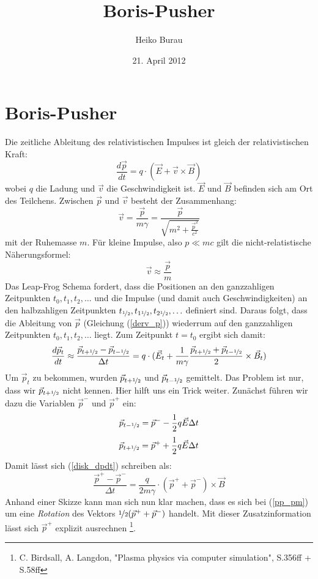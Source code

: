 \documentclass[a4paper,12pt]{article}
\title{Boris-Pusher}
\author{Heiko Burau}
\date{21. April 2012}
\begin{document}
\section{Boris-Pusher}

Die zeitliche Ableitung des relativistischen Impulses ist gleich der relativistischen Kraft:
\begin{equation}
	\label{derv_p}
	\frac{d\vec{p}}{dt} = q \cdot (\vec{E} + \vec{v} \times \vec{B})
\end{equation}
wobei $q$ die Ladung und $\vec{v}$ die Geschwindigkeit ist. $\vec{E}$ und $\vec{B}$ befinden sich am Ort des Teilchens. Zwischen $\vec{p}$ und $\vec{v}$ besteht der Zusammenhang:
\begin{equation}
	\vec{v} = \frac{\vec{p}}{m \gamma} = \frac{\vec{p}}{\sqrt{m^{2} + \frac{\vec{p}^{2}}{c^{2}}}}
\end{equation}
mit der Ruhemasse $m$. Für kleine Impulse, also $p \ll m c$ gilt die nicht-relatistische Näherungsformel:
\begin{equation}
	\vec{v} \approx \frac{\vec{p}}{m}
\end{equation}
Das Leap-Frog Schema fordert, dass die Positionen an den ganzzahligen Zeitpunkten $t_{0}, t_{1}, t_{2}, \ldots$ und die Impulse (und damit auch Geschwindigkeiten) an den halbzahligen Zeitpunkten $t_{\nicefrac{1}{2}}, t_{1\nicefrac{1}{2}}, t_{2\nicefrac{1}{2}}, \ldots$ definiert sind. Daraus folgt, dass die Ableitung von $\vec{p}$ (Gleich\-ung (\ref{derv_p})) wiederrum auf den ganzzahligen Zeitpunkten $t_{0}, t_{1}, t_{2}, \ldots$ liegt. Zum Zeitpunkt $t=t_{0}$ ergibt sich damit:
\begin{equation}
	\label{disk_dpdt}
	\frac{d\vec{p}_{t}}{dt} \approx \frac{\vec{p}_{t + \nicefrac{1}{2}} - \vec{p}_{t - \nicefrac{1}{2}}}{\Delta t}
	= q \cdot (\vec{E}_{t} + \frac{1}{m \gamma} \frac{\vec{p}_{t + \nicefrac{1}{2}} + \vec{p}_{t - \nicefrac{1}{2}}}{2} \times \vec{B}_{t} )
\end{equation}
Um $\vec{p}_{t}$ zu bekommen, wurden $\vec{p}_{t + \nicefrac{1}{2}}$ und $\vec{p}_{t - \nicefrac{1}{2}}$ gemittelt. Das Problem ist nur, dass wir $\vec{p}_{t + \nicefrac{1}{2}}$ nicht kennen. Hier hilft uns ein Trick weiter. Zunächst führen wir dazu die Variablen $\vec{p}^{-}$ und $\vec{p}^{+}$ ein:
\begin{equation}
	\vec{p}_{t - \nicefrac{1}{2}} = \vec{p}^{-} - \frac{1}{2} q \vec{E} \Delta t
\end{equation}
\begin{equation}
	\vec{p}_{t + \nicefrac{1}{2}} = \vec{p}^{+} + \frac{1}{2} q \vec{E} \Delta t
\end{equation}
Damit lässt sich (\ref{disk_dpdt}) schreiben als:
\begin{equation}
	\label{pp_pm}
	\frac{\vec{p}^{+} - \vec{p}^{-}}{\Delta t} = \frac{q}{2 m \gamma} \cdot (\vec{p}^{+} + \vec{p}^{-}) \times \vec{B}
\end{equation}
Anhand einer Skizze kann man sich nun klar machen, dass es sich bei (\ref{pp_pm}) um eine \textit{Rotation} des Vektors $\nicefrac{1}{2}(\vec{p}^{+} + \vec{p}^{-})$ handelt. Mit dieser Zusatzinformation lässt sich $\vec{p}^{+}$ explizit ausrechnen \footnote{C. Birdsall, A. Langdon, "Plasma physics via computer simulation", S.356ff + S.58ff}.
\end{document}
